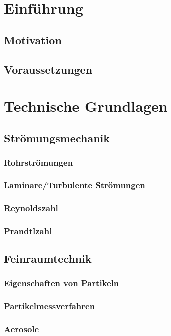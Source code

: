 \chapter{Einf\"{u}hrung}
\section{Motivation}
\section{Voraussetzungen}


\chapter{Technische Grundlagen}\label{ch:foundations}
\section{Str\"{o}mungsmechanik}
\subsection{Rohrstr\"{o}mungen}
\subsection{Laminare/Turbulente Str\"{o}mungen}
\subsection{Reynoldszahl}
\subsection{Prandtlzahl}

\section{Feinraumtechnik}
\subsection{Eigenschaften von Partikeln}
\subsection{Partikelmessverfahren}
\subsection{Aerosole}

